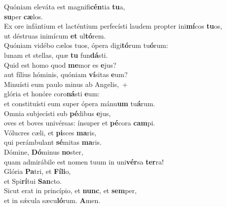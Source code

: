 \evenverse Quóniam eleváta est magnifi\textbf{cén}tia \textbf{tu}a,~\*\\
\evenverse \textbf{su}per \textbf{cæ}los.\\
\oddverse Ex ore infántium et lacténtium perfecísti laudem propter ini\textbf{mí}cos \textbf{tu}os,~\*\\
\oddverse ut déstruas inimícum \textbf{et} ul\textbf{tó}rem.\\
\evenverse Quóniam vidébo cælos tuos, ópera digi\textbf{tó}rum tu\textbf{ó}rum:~\*\\
\evenverse lunam et stellas, quæ \textbf{tu} fun\textbf{dá}sti.\\
\oddverse Quid est homo quod \textbf{me}mor es \textbf{e}jus?~\*\\
\oddverse aut fílius hóminis, quóniam \textbf{ví}sitas \textbf{e}um?\\
\evenverse Minuísti eum paulo minus ab Angelis,~+\\
\evenverse  glória et honóre coro\textbf{ná}sti \textbf{e}um:~\*\\
\evenverse et constituísti eum super ópera mánu\textbf{um} tu\textbf{á}rum.\\
\oddverse Omnia subjecísti sub \textbf{pé}dibus \textbf{e}jus,~\*\\
\oddverse oves et boves univérsas: ínsuper et \textbf{pé}cora \textbf{cam}pi.\\
\evenverse Vólucres cæli, et \textbf{pi}sces \textbf{ma}ris,~\*\\
\evenverse qui perámbulant \textbf{sé}mitas \textbf{ma}ris.\\
\oddverse Dómine, \textbf{Dó}minus \textbf{no}ster,~\*\\
\oddverse quam admirábile est nomen tuum in uni\textbf{vér}sa \textbf{ter}ra!\\
\evenverse Glória \textbf{Pa}tri, et \textbf{Fí}\textbf{li}o,~\*\\
\evenverse et Spi\textbf{rí}tui \textbf{San}cto.\\
\oddverse Sicut erat in princípio, et \textbf{nunc}, et \textbf{sem}per,~\*\\
\oddverse et in sǽcula sæcu\textbf{ló}rum. \textbf{A}men.\\

